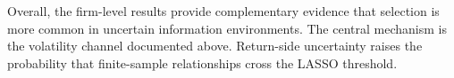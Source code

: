 Overall, the firm-level results provide complementary evidence that selection is more common in uncertain information environments. The central mechanism is the volatility channel documented above. Return-side uncertainty raises the probability that finite-sample relationships cross the LASSO threshold.



